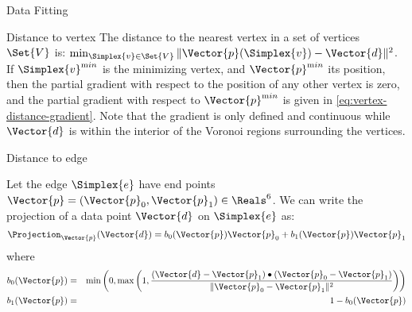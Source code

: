 \begin{plSection}{Data Fitting}
\begin{plSection}{Distance to vertex}
The distance to the nearest vertex in a set of vertices $\Set{V}$ is:
$\min_{\Simplex{v} \in \Set{V}} 
\|\Vector{p}(\Simplex{v})-\Vector{d}\|^2$.
If $\Simplex{v}^{\mathrm min}$ is the minimizing vertex,
and
$\Vector{p}^{\mathrm min}$ its position,
then the partial gradient with respect
to the position of any other vertex is zero,
and the partial gradient with respect to $\Vector{p}^{\mathrm min}$
is given in \cref{eq:vertex-distance-gradient}.
Note that the gradient is only defined and continuous
while $\Vector{d}$ is within the interior of the
Voronoi regions surrounding the vertices.

\end{plSection}%
\begin{plSection}{Distance to edge}
\label{sec:Distance-to-edge}

Let the edge $\Simplex{e}$ have end points 
$\Vector{p} = (\Vector{p}_0, \Vector{p}_1) \in \Reals^6$.
We can write the projection of a data point 
$\Vector{d}$ on $\Simplex{e}$ as:
\begin{equation}
\Projection_\Vector{p} (\Vector{d}) 
= b_0(\Vector{p}) \Vector{p}_0 + b_1(\Vector{p}) \Vector{p}_1
\end{equation}
where
\begin{eqnarray}
b_0(\Vector{p}) & = &
\min\left(0,\max\left(1,
\frac{ (\Vector{d}-\Vector{p}_1) \bullet (\Vector{p}_0-\Vector{p}_1) }
{\|\Vector{p}_0-\Vector{p}_1\|^2 }
\right) \right) \\
b_1(\Vector{p}) & = & 1-b_0(\Vector{p})
\nonumber
\end{eqnarray}


\end{plSection}
\end{plSection}
